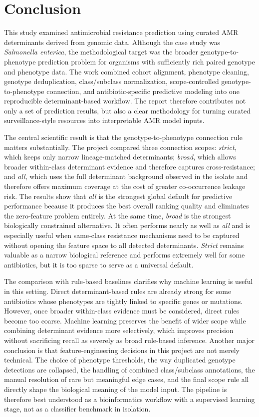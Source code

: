 \chapter*{Conclusion}

This study examined antimicrobial resistance prediction using curated AMR determinants derived from genomic data. Although the case study was \textit{Salmonella enterica}, the methodological target was the broader genotype-to-phenotype prediction problem for organisms with sufficiently rich paired genotype and phenotype data. The work combined cohort alignment, phenotype cleaning, genotype deduplication, class/subclass normalization, scope-controlled genotype-to-phenotype connection, and antibiotic-specific predictive modeling into one reproducible determinant-based workflow. The report therefore contributes not only a set of prediction results, but also a clear methodology for turning curated surveillance-style resources into interpretable AMR model inputs.

The central scientific result is that the genotype-to-phenotype connection rule matters substantially. The project compared three connection scopes: \textit{strict}, which keeps only narrow lineage-matched determinants; \textit{broad}, which allows broader within-class determinant evidence and therefore captures cross-resistance; and \textit{all}, which uses the full determinant background observed in the isolate and therefore offers maximum coverage at the cost of greater co-occurrence leakage risk. The results show that \textit{all} is the strongest global default for predictive performance because it produces the best overall ranking quality and eliminates the zero-feature problem entirely. At the same time, \textit{broad} is the strongest biologically constrained alternative. It often performs nearly as well as \textit{all} and is especially useful when same-class resistance mechanisms need to be captured without opening the feature space to all detected determinants. \textit{Strict} remains valuable as a narrow biological reference and performs extremely well for some antibiotics, but it is too sparse to serve as a universal default.

The comparison with rule-based baselines clarifies why machine learning is useful in this setting. Direct determinant-based rules are already strong for some antibiotics whose phenotypes are tightly linked to specific genes or mutations. However, once broader within-class evidence must be considered, direct rules become too coarse. Machine learning preserves the benefit of wider scope while combining determinant evidence more selectively, which improves precision without sacrificing recall as severely as broad rule-based inference. Another major conclusion is that feature-engineering decisions in this project are not merely technical. The choice of phenotype thresholds, the way duplicated genotype detections are collapsed, the handling of combined class/subclass annotations, the manual resolution of rare but meaningful edge cases, and the final scope rule all directly shape the biological meaning of the model input. The pipeline is therefore best understood as a bioinformatics workflow with a supervised learning stage, not as a classifier benchmark in isolation.

